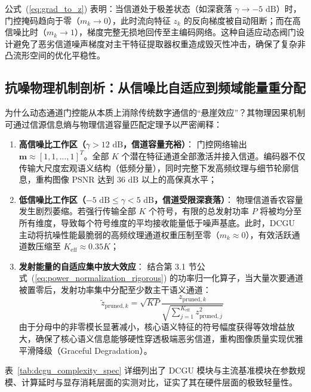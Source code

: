 公式~(\ref{eq:grad_to_z}) 表明：当信道处于极差状态（如深衰落 $\gamma \to -5\text{ dB}$）时，门控掩码趋向于零（$m_k \to 0$），此时流向特征 $z_k$ 的反向梯度被自动阻断；而在高信噪比时（$m_k \to 1$），梯度完整无损地回传至主编码网络。这种自适应动态阀门设计避免了恶劣信道噪声梯度对主干特征提取器权重造成毁灭性冲击，确保了复杂非凸流形空间的优化平稳性。

\subsection{抗噪物理机制剖析：从信噪比自适应到频域能量重分配}
为什么动态通道门控能从本质上消除传统数字通信的“悬崖效应”？其物理因果机制可通过信源信息熵与物理信道容量匹配定理予以严密阐释：

\begin{enumerate}
  \item \textbf{高信噪比工作区（$\gamma > 12\text{ dB}$，信道容量充裕）}：
  门控网络输出 $\bm{m} \approx [1, 1, \dots, 1]^T$。全部 $K$ 个潜在特征通道全部激活并接入信道。编码器不仅传输大尺度宏观语义结构（低频分量），同时完整下发高频纹理与细节轮廓信息，重构图像 PSNR 达到 $36\text{ dB}$ 以上的高保真水平；
  \item \textbf{低信噪比工作区（$-5\text{ dB} \le \gamma < 5\text{ dB}$，信道受限深衰落）}：
  物理信道香农容量发生剧烈萎缩。若强行传输全部 $K$ 个符号，有限的总发射功率 $P$ 将被均分至所有维度，导致每个符号维度的平均接收能量低于噪声基底。此时，DCGU 主动将抗噪性能最脆弱的高频纹理通道权重压制至零（$m_k \approx 0$），有效活跃通道数压缩至 $K_{\text{eff}} \approx 0.35 K$；
  \item \textbf{发射能量的自适应集中放大效应}：
  结合第 3.1 节公式~(\ref{eq:power_normalization_rigorous}) 的功率归一化算子，当大量次要通道被置零后，发射功率集中分配至少数主干语义通道：
  \begin{equation}
    \tilde{z}_{\text{pruned}, k} = \sqrt{K P} \frac{z_{\text{pruned}, k}}{\sqrt{\sum_{j=1}^{K_{\text{eff}}} z_{\text{pruned}, j}^2}}
  \end{equation}
  由于分母中的非零模长显著减小，核心语义特征的符号幅度获得等效增益放大，确保了核心语义信息能够硬性穿透极端恶劣信道，重构图像质量实现优雅平滑降级（Graceful Degradation）。
\end{enumerate}

表~\ref{tab:dcgu_complexity_spec} 详细列出了 DCGU 模块与主流基准模块在参数规模、计算延时与显存消耗层面的实测对比，证实了其在硬件层面的极致轻量性。

